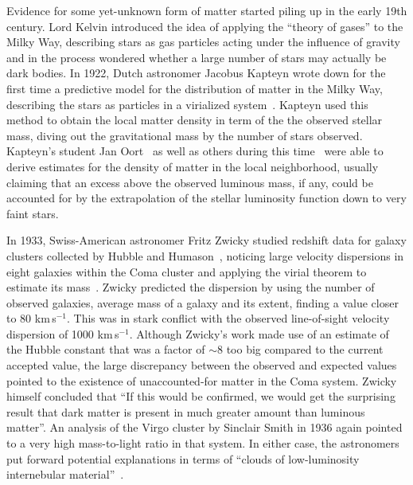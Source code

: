 Evidence for some yet-unknown form of matter started piling up in the early 19th century. Lord Kelvin introduced the idea of applying the ``theory of gases'' to the Milky Way, describing stars as gas particles acting under the influence of gravity and in the process wondered whether a large number of stars may actually be dark bodies. In 1922, Dutch astronomer Jacobus Kapteyn wrote down for the first time a predictive model for the distribution of matter in the Milky Way, describing the stars as particles in a virialized system~\cite{1922ApJ....55..302K}. Kapteyn used this method to obtain the local matter density in term of the the observed stellar mass, diving out the gravitational mass by the number of stars observed. Kapteyn's student Jan Oort~\cite{1932BAN.....6..249O} as well as others during this time~\cite{1922MNRAS..82..122J} were able to derive estimates for the density of matter in the local neighborhood, usually claiming that an excess above the observed luminous mass, if any, could be accounted for by the extrapolation of the stellar luminosity function down to very faint stars.

In 1933, Swiss-American astronomer Fritz Zwicky studied redshift data for galaxy clusters collected by Hubble and Humason~\cite{1931ApJ....74...43H}, noticing large velocity dispersions in eight galaxies within the Coma cluster and applying the virial theorem to estimate its mass~\cite{1933AcHPh...6..110Z}. Zwicky predicted the dispersion by using the number of observed galaxies, average mass of a galaxy and its extent, finding a value closer to 80 km\,s$^{-1}$. This was in stark conflict with the observed line-of-sight velocity dispersion of 1000 km\,s$^{-1}$. Although Zwicky's work made use of an estimate of the Hubble constant that was a factor of $\sim$8 too big compared to the current accepted value, the large discrepancy between the observed and expected values pointed to the existence of unaccounted-for matter in the Coma system. Zwicky himself concluded that ``If this would be confirmed, we would get the surprising result that dark matter is present in much greater amount than luminous matter''. An analysis of the Virgo cluster by Sinclair Smith in 1936 again pointed to a very high mass-to-light ratio in that system. In either case, the astronomers put forward potential explanations in terms of ``clouds of low-luminosity internebular material''~\cite{1937ApJ....86..217Z}.

